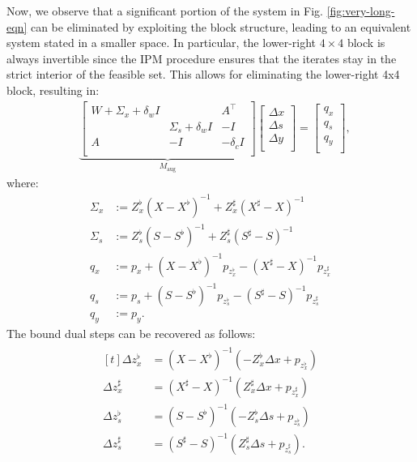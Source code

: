 Now, we observe that a significant portion of the system in Fig.
\eqref{fig:very-long-eqn} can be eliminated by exploiting the block
structure, leading to an equivalent system stated in a smaller
space. In particular, the lower-right $4\times 4$ block is always
invertible since the IPM procedure ensures that the iterates stay in
the strict interior of the feasible set. This allows for eliminating
the lower-right 4x4 block, resulting in:
\begin{align}\label{eqn:very-long-reduced}
  &
    \underbrace{
    \begin{bmatrix}
      W  + \Sigma_x + \delta_w I & & A^{\top} \\
      & \Sigma_s + \delta_w I & -I\\
      A& -I & -\delta_c I\\
    \end{bmatrix}
  }_{M_{\text{aug}}}
  \begin{bmatrix}
    \Delta x \\
    \Delta s \\
    \Delta y \\
  \end{bmatrix}=
  \begin{bmatrix}
    q_x \\
    q_s\\
    q_y\\
  \end{bmatrix},
\end{align}
where:
\begin{align*}
  \Sigma_x&:= Z^\flat_x (X-X^\flat)^{-1}+ Z^\sharp_x (X^\sharp-X)^{-1}\\
  \Sigma_s&:= Z^\flat_s (S-S^\flat)^{-1}+ Z^\sharp_s (S^\sharp-S)^{-1}\\
  q_x&:=p_x + (X-X^\flat)^{-1} p_{z^\flat_x}-  (X^\sharp-X)^{-1} p_{z^\sharp_x}\\
  q_s&:=p_s + (S-S^\flat)^{-1} p_{z^\flat_s}-  (S^\sharp-S)^{-1} p_{z^\sharp_s}\\
  q_y&:=p_y.
\end{align*}
The bound dual steps can be recovered as follows:
\begin{align}\label{eqn:recover-1}
  \begin{aligned}[t]
    \Delta z^\flat_x &= \left(X-X^\flat\right)^{-1} \left(-Z^\flat_x \Delta x  + p_{z^\flat_x}\right)\\
    \Delta z^\sharp_x &= \left(X^\sharp-X\right)^{-1} \left(Z^\sharp_x \Delta x  + p_{z^\sharp_x}\right)\\
    \Delta z^\flat_s &= \left(S-S^\flat\right)^{-1} \left(-Z^\flat_s \Delta s  + p_{z^\flat_s}\right)\\
    \Delta z^\sharp_s &= \left(S^\sharp-S\right)^{-1} \left(Z^\sharp_s \Delta s  + p_{z^\sharp_s}\right).
  \end{aligned}
\end{align}
